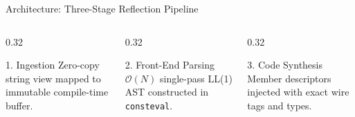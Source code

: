 \documentclass[aspectratio=169,10pt]{beamer}
\begin{document}
\begin{frame}{Architecture: Three-Stage Reflection Pipeline}
  \vspace{0.8em}
  \begin{columns}[T]
    \begin{column}{0.32\textwidth}
      \begin{block}{1. Ingestion}
        Zero-copy string view mapped to immutable compile-time buffer.
      \end{block}
    \end{column}
    \begin{column}{0.32\textwidth}
      \begin{block}{2. Front-End Parsing}
        $\mathcal{O}(N)$ single-pass LL(1) AST constructed in \texttt{consteval}.
      \end{block}
    \end{column}
    \begin{column}{0.32\textwidth}
      \begin{block}{3. Code Synthesis}
        Member descriptors injected with exact wire tags and types.
      \end{block}
    \end{column}
  \end{columns}
\end{frame}
\end{document}
